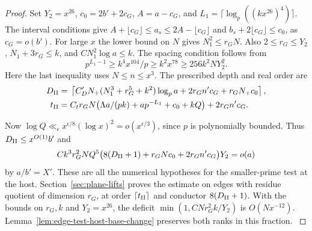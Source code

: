 \begin{proof}
Set \(Y_2=x^{26}\),
\(c_0=2b'+2c_G\), \(A=a-c_G\), and
\(L_1=\lceil\log_p((kx^{26})^4)\rceil\). The interval conditions
give \(A+\lfloor c_G\rfloor\le a_s\le 2A-\lfloor c_G\rfloor\)
and \(b_s+2\lfloor c_G\rfloor\le c_0\), as \(c_G=o(b')\).
For large \(x\) the lower bound on \(N\) gives
\(N_1^2\le r_G N\). Also \(2\le r_G\le Y_2\),
\(N_1+3r_G\le k\), and \(C N_1^2\log a\le k\). The spacing
condition follows from
\[
 p^{L_1-1}\ge k^4 x^{104}/p
 \ge k^2 x^{78}\ge256k^2 N Y_2^2 .
\]
Here the last inequality uses \(N\le n\le x^3\).
The prescribed depth and real order are
\begin{equation}\label{eq:small-prime-depth-order}\begin{aligned}
 D_{\rm II}={}&\left\lceil C_D' N_+(N_1^3+r_G^5+k^2)\log_p a
                 +2r_Gn' c_G+r_G N_+c_0\right\rceil,\\
 t_{\rm II}={}&C_t r_G N\big(\Lambda a/(pk)+a p^{-L_1}
                         +c_0+kQ\big)+2r_G n'c_G .
\end{aligned}\end{equation}

Now \(\log Q\ll_\epsilon x^{\epsilon/8}(\log x)^2
=o(x^{\epsilon/3})\), since \(p\) is polynomially bounded.
Thus \(D_{\rm II}\le x^{O(1)} b'\) and
\[
 C k^3r_G^2NQ^5\big(8(D_{\rm II}+1)+r_G N c_0+
                 2r_G n'c_G\big)Y_2=o(a)
\]
by \(a/b'=X'\). These are all the numerical hypotheses for
the smaller-prime test at the host. Section~\ref{sec:plane-lifts}
proves the estimate on edges with residue quotient of dimension
\(r_G\), at order \(\lceil t_{\rm II}\rceil\) and conductor
\(8(D_{\rm II}+1)\). With the bounds on \(r_G,k\) and
\(Y_2=x^{26}\), the deficit
\(\min(1,CNr_G^2 k/Y_2)\) is \(O(Nx^{-12})\).
Lemma~\ref{lem:edge-test-host-base-change} preserves both
ranks in this fraction. \label{cor:host-edge-tests-2}
\end{proof}
